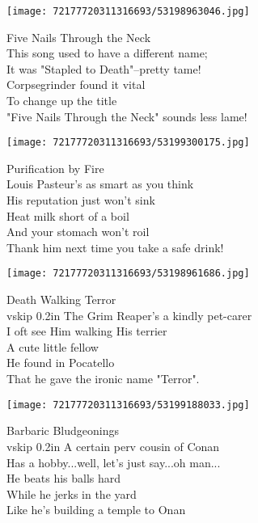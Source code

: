 \documentclass[10pt,letterpaper]{article}
\begin{document}
\begin{center}\texttt{[image: 72177720311316693/53198963046.jpg]}
\end{center}
\begin{center}
Five Nails Through the Neck\\
\vskip 0.2in
This song used to have a different name;\\
It was "Stapled to Death"--pretty tame!\\
Corpsegrinder found it vital\\
To change up the title\\
"Five Nails Through the Neck" sounds less lame!\\
\end{center}
\pagebreak

\begin{center}
\texttt{[image: 72177720311316693/53199300175.jpg]}
\end{center}

\begin{center}
Purification by Fire\\
\vskip 0.2in
Louis Pasteur's as smart as you think\\
His reputation just won't sink\\
Heat milk short of a boil\\
And your stomach won't roil\\
Thank him next time you take a safe drink!\\
\end{center}
\pagebreak

\begin{center}\texttt{[image: 72177720311316693/53198961686.jpg]}
\end{center}
\begin{center}
Death Walking Terror\\
vskip 0.2in
The Grim Reaper's a kindly pet-carer\\
I oft see Him walking His terrier\\
A cute little fellow\\
He found in Pocatello\\
That he gave the ironic name "Terror".\\
\end{center}
\pagebreak

\begin{center}\texttt{[image: 72177720311316693/53199188033.jpg]}
\end{center}
\begin{center}
Barbaric Bludgeonings\\
vskip 0.2in
A certain perv cousin of Conan\\
Has a hobby...well, let's just say...oh man...\\
He beats his balls hard\\
While he jerks in the yard\\
Like he's building a temple to Onan\\
\end{center}
\pagebreak
\end{document}
